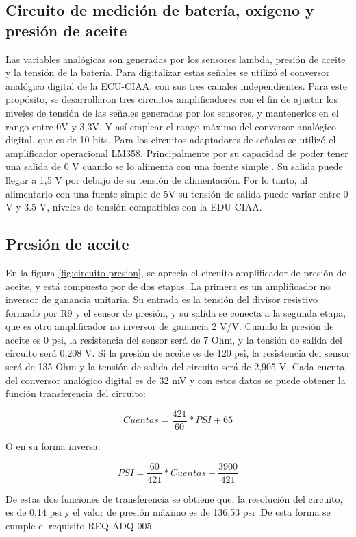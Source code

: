 \subsection{Circuito de medición de batería, oxígeno y presión de aceite}

Las variables analógicas son generadas por los sensores lambda, presión de aceite y la tensión de la batería. Para digitalizar estas señales se utilizó el conversor analógico digital de la ECU-CIAA, con sus tres canales independientes. Para este propósito, se desarrollaron tres circuitos amplificadores con el fin de ajustar los niveles de tensión de las señales generadas por los sensores, y mantenerlos en el rango entre 0V y 3,3V. Y así emplear el rango máximo del conversor analógico digital, que es de 10 bits. Para los circuitos adaptadores de señales se utilizó el amplificador operacional LM358. Principalmente por su capacidad de poder tener una salida de 0 V cuando se lo alimenta con una fuente simple \cite{lm358}. Su salida puede llegar a 1,5 V por debajo de su tensión de alimentación. Por lo tanto, al alimentarlo con una fuente simple de 5V su tensión de salida puede variar entre 0 V y 3.5 V, niveles de tensión compatibles con la EDU-CIAA.

\subsection{Presión de aceite}

En la figura \ref{fig:circuito-presion}, se aprecia el circuito amplificador de presión de aceite, y está compuesto por de dos etapas. La primera es un amplificador no inversor de ganancia unitaria. Su entrada es la tensión del divisor resistivo formado por R9 y el sensor de presión, y su salida se conecta a la segunda etapa, que es otro amplificador no inversor de ganancia 2 V/V.
Cuando la presión de aceite es 0 psi, la resistencia del sensor será de 7 Ohm, y la tensión de salida del circuito será 0,208 V. Si la presión de aceite es de 120 psi, la resistencia del sensor será de 135 Ohm y la tensión de salida del circuito será de 2,905 V. Cada cuenta del conversor analógico digital es de 32 mV y con estos datos se puede obtener la función transferencia del circuito:

\[ Cuentas = \frac{421}{60} * PSI + 65\]

O en su forma inversa:

\[ PSI = \frac{60}{421} * Cuentas - \frac{3900}{421} \]

De estas dos funciones de transferencia se obtiene que, la resolución del circuito, es de 0,14 psi y el valor de presión máximo es de 136,53 psi .De esta forma se cumple el requisito REQ-ADQ-005.

